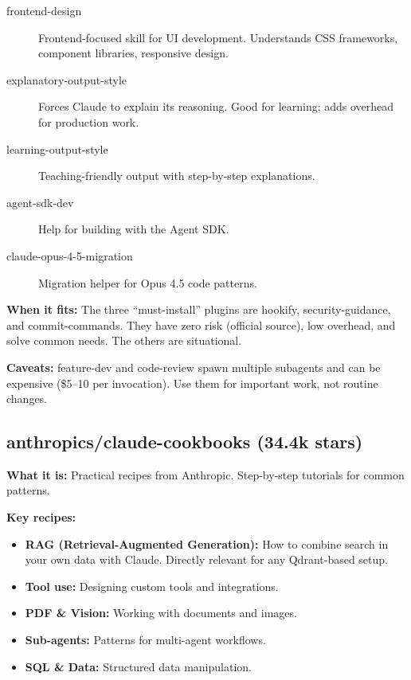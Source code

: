 \documentclass[11pt,a4paper]{article}
\begin{document}
\begin{description}
  \item[frontend-design] Frontend-focused skill for UI development. Understands CSS frameworks, component libraries, responsive design.

  \item[explanatory-output-style] Forces Claude to explain its reasoning. Good for learning; adds overhead for production work.

  \item[learning-output-style] Teaching-friendly output with step-by-step explanations.

  \item[agent-sdk-dev] Help for building with the Agent SDK.

  \item[claude-opus-4-5-migration] Migration helper for Opus 4.5 code patterns.
\end{description}

\textbf{When it fits:} The three ``must-install'' plugins are hookify, security-guidance, and commit-commands. They have zero risk (official source), low overhead, and solve common needs. The others are situational.

\textbf{Caveats:} feature-dev and code-review spawn multiple subagents and can be expensive (\$5--10 per invocation). Use them for important work, not routine changes.

\subsection{anthropics/claude-cookbooks (34.4k stars)}

\textbf{What it is:} Practical recipes from Anthropic. Step-by-step tutorials for common patterns.

\textbf{Key recipes:}
\begin{itemize}
  \item \textbf{RAG (Retrieval-Augmented Generation):} How to combine search in your own data with Claude. Directly relevant for any Qdrant-based setup.
  \item \textbf{Tool use:} Designing custom tools and integrations.
  \item \textbf{PDF \& Vision:} Working with documents and images.
  \item \textbf{Sub-agents:} Patterns for multi-agent workflows.
  \item \textbf{SQL \& Data:} Structured data manipulation.
\end{itemize}
\end{document}
